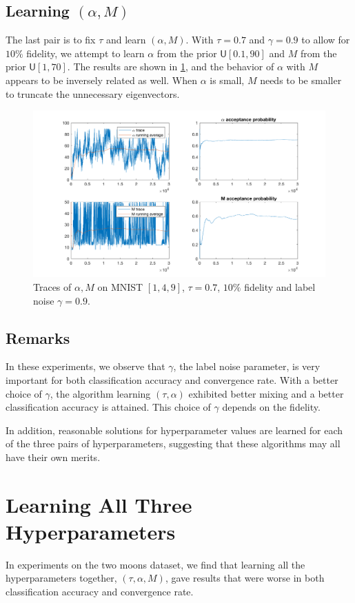 \documentclass{siamart1116}
\begin{document}
    \subsection{Learning $(\alpha, M)$}
        The last pair is to fix $\tau$ and learn $(\alpha, M)$. With $\tau=0.7$ and $\gamma=0.9$ to allow for $10\%$ fidelity, we attempt to learn $\alpha$ from the prior $\mathsf{U}[0.1, 90]$ and $M$ from the prior $\mathsf{U}[1,70]$. The results are shown in \cref{aM_mnist_1}, and the behavior of $\alpha$ with $M$ appears to be inversely related as well. When $\alpha$ is small, $M$ needs to be smaller to truncate the unnecessary eigenvectors.

        \begin{figure}[!htb]
        \centering
        \caption{\label{aM_mnist_1}Traces of $\alpha, M$ on MNIST $[1, 4, 9]$, $\tau = 0.7$, $10\%$ fidelity and label noise $\gamma = 0.9$.}
        \includegraphics[width=0.8\linewidth]{choose_hyp/a_M/tau=0_7.png}
        \end{figure}

    \subsection{Remarks}
        In these experiments, we observe that $\gamma$, the label noise parameter, is very important for both classification accuracy and convergence rate. With a better choice of $\gamma$, the algorithm learning $(\tau, \alpha)$ exhibited better mixing and a better classification accuracy is attained. This choice of $\gamma$ depends on the fidelity.

        In addition, reasonable solutions for hyperparameter values are learned for each of the three pairs of hyperparameters, suggesting that these algorithms may all have their own merits. 

\section{Learning All Three Hyperparameters}
    In experiments on the two moons dataset, we find that learning all the hyperparameters together, $(\tau, \alpha, M)$, gave results that were worse in both classification accuracy and convergence rate.
\end{document}
